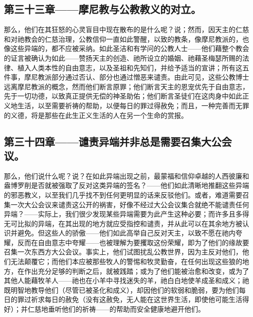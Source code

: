 
\subsection{第三十三章——摩尼教与公教教义的对立。}

那么，他们在其狂怒的心灵盲目中现在散布的是什么呢？说；然而，因天主的仁慈和对祂教会的仁慈治理，公教信仰一直如此警醒，以致的教条，像摩尼教派的，也像这些异端的，都不应被采纳。如此圣洁和有学问的公教人士——他们藉整个教会的证言被确认为如此——赞扬天主的创造、祂所设立的婚姻、祂藉圣梅瑟所赐的法律、植入人类本性的自由意志，以及圣祖和先知们，并给予适当的宣讲；所有这五件事，摩尼教派部分通过否认、部分也通过憎恶来谴责。由此可见，这些公教博士远离摩尼教派的概念，然而他们断言原罪；他们断言天主的恩宠优先于自由意志，先于一切功德，以致真正提供无偿的神圣助佑；他们断言圣徒们在这肉身中如此正义地生活，以至需要祈祷的帮助，以便每日的罪过得赦免；而且，一种完善而无罪的义德，将是那些在此生正义生活的人在另一个生命的赏报。\par


\subsection{第三十四章——谴责异端并非总是需要召集大公会议。}

那么，他们说什么呢？说？在如此异端出现之前，最蒙福和信仰卓越的人西彼廉和盎博罗削是否就被强取了反对这类异端的签名？——他们如此清晰地推翻这些异端的邪恶教义，以至我们几乎找不到任何更明显的话来反驳他们。或者，难道需要召集一次大公会议来谴责这公开的祸害，好像不经过大公会议集合就绝不能谴责任何异端？——实际上，我们很少发现某些异端需要为此产生这种必要；而许多且多得无可比拟的异端，在其出现的地方就应受指控和谴责，并从此可以在其余地方被认识并避免。但这些人的骄傲——他们如此高举自己反对天主，以致不愿在祂内夸耀，反而在自由意志中夸耀——也被理解为要攫取这份荣耀，即为了他们的缘故要召集一次东西方大公会议。事实上，他们试图扰乱公教世界，因为主反对他们，他们无法颠覆它；而他们本应被那些牧人的警惕和牧灵勤奋，在任何出现这些狼的地方，在作出充分足够的判断之后，就被践踏；或为了他们能被治愈和改变，或为了其他人能藉牧羊人——祂也在小羊中寻找迷失的羊，祂白白地使羊成圣和成义；祂既明智地教导他们（尽管已被圣化和成义），却因他们的软弱和脆弱，要为他们每日的罪过祈求每日的赦免（没有这赦免，无人能在这世界生活，即使他可能生活得好）；并仁慈地垂听他们的祈祷——的帮助而安全健康地避开他们。\par

